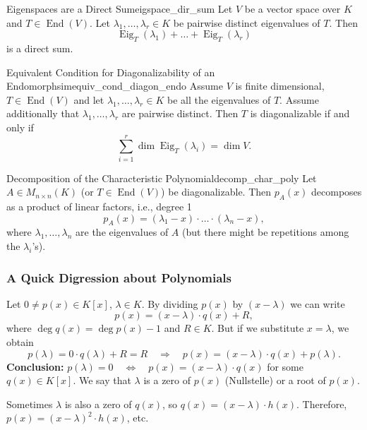 \begin{proposition}{Eigenspaces are a Direct Sum}{eigspace_dir_sum}
	Let $V$ be a vector space over $K$ and $T \in \operatorname{End}(V)$. Let $\lambda_1, \hdots , \lambda_r \in K$ be pairwise distinct eigenvalues of $T$. Then
	\[
		\operatorname{Eig}_T(\lambda_1) + \hdots + \operatorname{Eig}_T(\lambda_r)
	\]
	is a direct sum.
\end{proposition}

\begin{corollary}{Equivalent Condition for Diagonalizability of an Endomorphsim}{equiv_cond_diagon_endo}
	Assume $V$ is finite dimensional, $T \in \operatorname{End}(V)$ and let $\lambda_1, \hdots , \lambda_r \in K$ be all the eigenvalues of $T$. Assume additionally that $\lambda_1, \hdots , \lambda_r$ are pairwise distinct. Then $T$ is diagonalizable if and only if
	\[
		\sum_{i=1}^{r} \dim \operatorname{Eig}_T(\lambda_i) = \dim V.
	\]
\end{corollary}

\begin{lemma}{Decomposition of the Characteristic Polynomial}{decomp_char_poly}
	Let $A \in M_{n \times n}(K)$ (or $T \in \operatorname{End}(V)$) be diagonalizable. Then $p_A(x)$ decomposes as a product of linear factors, i.e., degree 1
	\[
		p_A(x) = (\lambda_1 - x)\cdot \hdots \cdot (\lambda_n - x),
	\]
	where $\lambda_1, \hdots , \lambda_n$ are the eigenvalues of $A$ (but there might be repetitions among the $\lambda_i$'s).
\end{lemma}

\subsubsection{A Quick Digression about Polynomials}
Let $0 \neq p(x) \in K[x]$, $\lambda \in K$. By dividing $p(x)$ by $(x - \lambda)$ we can write
\[
	p(x) = (x - \lambda)\cdot q(x) + R,
\]
where $\deg q(x) = \deg p(x) - 1$ and $R \in K$. But if we substitute $x = \lambda$, we obtain
\[
	p(\lambda) = 0 \cdot q(\lambda) + R = R \quad \Longrightarrow \quad p(x) = (x - \lambda)\cdot q(x) + p(\lambda).
\]
\textbf{Conclusion:} $p(\lambda) = 0 \quad \Longleftrightarrow \quad p(x) = (x - \lambda) \cdot q(x)$ for some $q(x) \in K[x]$. We say that $\lambda$ is a zero of $p(x)$ (Nullstelle) or a root of $p(x)$.

Sometimes $\lambda$ is also a zero of $q(x)$, so $q(x) = (x - \lambda) \cdot h(x)$. Therefore, $p(x) = (x - \lambda)^2 \cdot h(x)$, etc.

